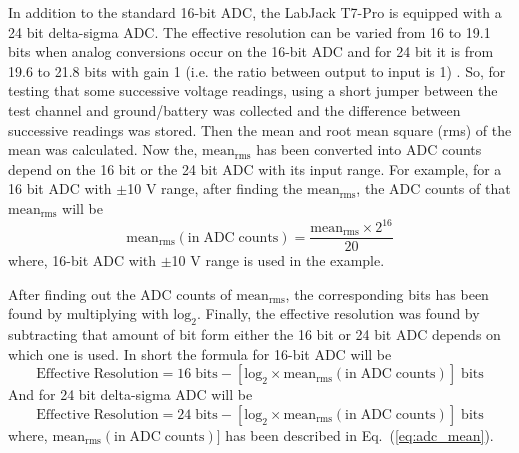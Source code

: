 In addition to the standard 16-bit ADC, the LabJack T7-Pro is equipped with a 24 bit delta-sigma ADC. The effective resolution can be varied from 16 to 19.1 bits when analog conversions occur on the 16-bit ADC and for 24 bit it is from 19.6 to 21.8 bits with gain 1 (i.e. the ratio between output to input is 1) \cite{T7}. So, for testing that some successive voltage readings, using a short jumper between the test channel and ground/battery was collected and the difference between successive readings was stored. Then the mean and root mean square (rms) of the mean was calculated. Now the, $\mathrm{mean_{rms}}$ has been converted into ADC counts depend on the 16 bit or the 24 bit ADC with its input range. For example, for a 16 bit ADC with $\pm$10 V range, after finding the $\mathrm{mean_{rms}}$, the ADC counts of that $\mathrm{mean_{rms}}$ will be
\begin{equation}\label{eq:adc_mean}
    \mathrm{mean_{rms} (in\;ADC \;counts)=\frac{mean_{rms}\times 2^{16}}{20}}
\end{equation}
where, 16-bit ADC with $\pm$10 V range is used in the example.

After finding out the ADC counts of $\mathrm{mean_{rms}}$, the corresponding bits has been found by multiplying with $\mathrm{log_2}$.  Finally, the effective resolution was found by subtracting that amount of bit form either the 16 bit or 24 bit ADC depends on which one is used. In short the formula \cite{T7} for 16-bit ADC will be
\begin{equation}
    \mathrm{Effective\;Resolution=16\;bits - [log_2 \times mean_{rms} (in\;ADC \;counts)]\;bits}
\end{equation}
And for 24 bit delta-sigma ADC will be
\begin{equation}
    \mathrm{Effective\;Resolution=24\;bits - [log_2 \times mean_{rms} (in\;ADC \;counts)]\;bits}
\end{equation}
where, $\mathrm{mean_{rms} (in\;ADC \;counts)]}$ has been described in Eq.~(\ref{eq:adc_mean}).


